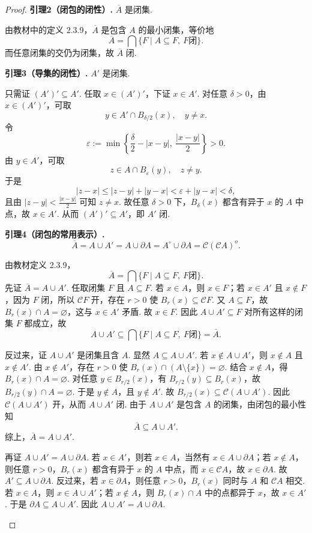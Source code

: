 \begin{3b}
\begin{enumerate}
\begin{proof}
\textbf{引理2（闭包的闭性）.}
$\overline{A}$ 是闭集.

\begin{proofc}
由教材中的定义 2.3.9，$\overline{A}$ 是包含 $A$ 的最小闭集，等价地
\[
\overline{A}=\bigcap\{F\mid A\subseteq F,\ F\text{闭}\}.
\]
而任意闭集的交仍为闭集，故 $\overline{A}$ 闭.
\end{proofc}
\textbf{引理3（导集的闭性）.}
$A'$ 是闭集.

\begin{proofc}
只需证 $(A')'\subseteq A'$.
任取 $x\in (A')'$，下证 $x\in A'$.
对任意 $\delta>0$，由 $x\in (A')'$，可取
\[
y\in A'\cap B_{\delta/2}(x),\quad y\neq x.
\]
令
\[
\varepsilon:=\min\left\{\frac{\delta}{2}-|x-y|,\ \frac{|x-y|}{2}\right\}>0.
\]
由 $y\in A'$，可取
\[
z\in A\cap B_{\varepsilon}(y),\quad z\neq y.
\]
于是
\[
|z-x|\le |z-y|+|y-x|<\varepsilon+|y-x|<\delta,
\]
且由 $|z-y|<\frac{|x-y|}{2}$ 可知 $z\neq x$.
故任意 $\delta>0$ 下，$B_\delta(x)$ 都含有异于 $x$ 的 $A$ 中点，故 $x\in A'$.
从而 $(A')'\subseteq A'$，即 $A'$ 闭.
\end{proofc}
\textbf{引理4（闭包的常用表示）.}
\[
\overline{A}=A\cup A'=A\cup\partial A=A^\circ\cup\partial A=\mathscr{C}(\mathscr{C}A)^o.
\]

\begin{proofc}
由教材定义 2.3.9，
\[
\overline{A}=\bigcap\{F\mid A\subseteq F,\ F\text{闭}\}.
\]
先证 $\overline{A}=A\cup A'$.
任取闭集 $F$ 且 $A\subseteq F$.
若 $x\in A$，则 $x\in F$；若 $x\in A'$ 且 $x\notin F$，因为 $F$ 闭，所以 $\mathscr{C}F$ 开，存在 $r>0$ 使 $B_r(x)\subseteq\mathscr{C}F$.
又 $A\subseteq F$，故 $B_r(x)\cap A=\varnothing$，这与 $x\in A'$ 矛盾.
故 $x\in F$.
因此 $A\cup A'\subseteq F$ 对所有这样的闭集 $F$ 都成立，故
\[
A\cup A'\subseteq\bigcap\{F\mid A\subseteq F,\ F\text{闭}\}=\overline{A}.
\]

反过来，证 $A\cup A'$ 是闭集且含 $A$.
显然 $A\subseteq A\cup A'$.
若 $x\notin A\cup A'$，则 $x\notin A$ 且 $x\notin A'$.
由 $x\notin A'$，存在 $r>0$ 使 $B_r(x)\cap(A\setminus\{x\})=\varnothing$.
结合 $x\notin A$，得 $B_r(x)\cap A=\varnothing$.
对任意 $y\in B_{r/2}(x)$，有 $B_{r/2}(y)\subseteq B_r(x)$，故 $B_{r/2}(y)\cap A=\varnothing$.
于是 $y\notin A$，且 $y\notin A'$.
故 $B_{r/2}(x)\subseteq\mathscr{C}(A\cup A')$.
因此 $\mathscr{C}(A\cup A')$ 开，从而 $A\cup A'$ 闭.
由于 $A\cup A'$ 是包含 $A$ 的闭集，由闭包的最小性知
\[
\overline{A}\subseteq A\cup A'.
\]
综上，$\overline{A}=A\cup A'$.

再证 $A\cup A'=A\cup\partial A$.
若 $x\in A'$，则若 $x\in A$，当然有 $x\in A\cup\partial A$；若 $x\notin A$，则任意 $r>0$，$B_r(x)$ 都含有异于 $x$ 的 $A$ 中点，而 $x\in\mathscr{C}A$，故 $x\in\partial A$.
故 $A'\subseteq A\cup\partial A$.
反过来，若 $x\in\partial A$，则任意 $r>0$，$B_r(x)$ 同时与 $A$ 和 $\mathscr{C}A$ 相交.
若 $x\in A$，则 $x\in A\cup A'$；若 $x\notin A$，则 $B_r(x)\cap A$ 中的点都异于 $x$，故 $x\in A'$.
于是 $\partial A\subseteq A\cup A'$.
因此 $A\cup A'=A\cup\partial A$.


\end{proofc}
\end{proof}
\end{enumerate}
\end{3b}
